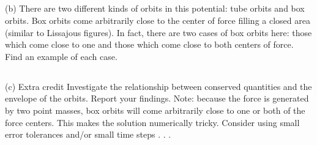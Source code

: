 \subsection{}
(b) There are two different kinds of orbits in this potential: tube orbits
and box orbits. Box orbits come arbitrarily close to the center of
force filling a closed area (similar to Lissajous figures). In fact,
there are two cases of box orbits here: those which come close to
one and those which come close to both centers of force. Find an
example of each case.
\subsection{}
(c) Extra credit Investigate the relationship between conserved quantities and the envelope of the orbits. Report your findings.
Note: because the force is generated by two point masses, box orbits
will come arbitrarily close to one or both of the force centers. This
makes the solution numerically tricky. Consider using small error tolerances and/or small time steps . . .